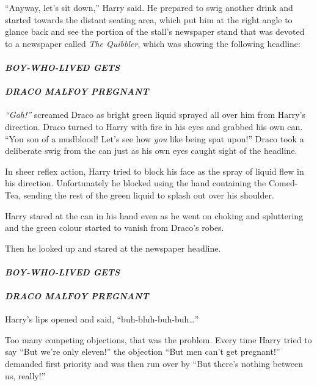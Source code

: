 ``Anyway, let's sit down,'' Harry said. He prepared to swig another
drink and started towards the distant seating area, which put him at the
right angle to glance back and see the portion of the stall's newspaper
stand that was devoted to a newspaper called \emph{The Quibbler}, which
was showing the following headline:

\paragraph{\emph{BOY-WHO-LIVED GETS}}

\paragraph{\emph{DRACO MALFOY PREGNANT}}

\emph{``Gah!''} screamed Draco as bright green liquid sprayed all over
him from Harry's direction. Draco turned to Harry with fire in his eyes
and grabbed his own can. ``You son of a mudblood! Let's see how
\emph{you} like being spat upon!'' Draco took a deliberate swig from the
can just as his own eyes caught sight of the headline.

In sheer reflex action, Harry tried to block his face as the spray of
liquid flew in his direction. Unfortunately he blocked using the hand
containing the Comed-Tea, sending the rest of the green liquid to splash
out over his shoulder.

Harry stared at the can in his hand even as he went on choking and
spluttering and the green colour started to vanish from Draco's robes.

Then he looked up and stared at the newspaper headline.

\paragraph{\emph{BOY-WHO-LIVED GETS}}

\paragraph{\emph{DRACO MALFOY PREGNANT}}

Harry's lips opened and said, ``buh-bluh-buh-buh\ldots{}''

Too many competing objections, that was the problem. Every time Harry
tried to say ``But we're only eleven!'' the objection ``But men can't
get pregnant!'' demanded first priority and was then run over by ``But
there's nothing between us, really!''

